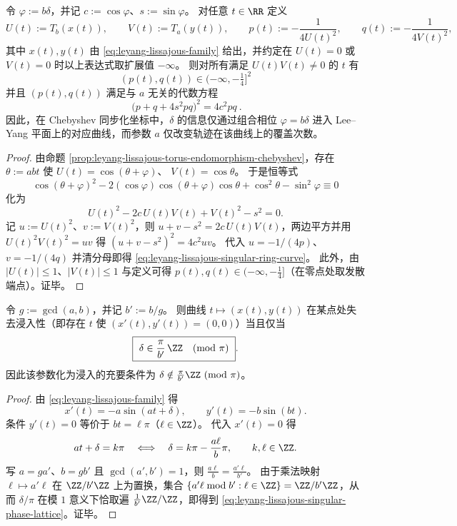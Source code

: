 \begin{theorem}\label{thm:leyang-lissajous-singular-ring-normal-form}
令 \(\varphi:=b\delta\)，并记 \(c:=\cos\varphi\)、\(s:=\sin\varphi\)。
对任意 \(t\in\RR\) 定义
\[
U(t):=T_b(x(t)),\qquad V(t):=T_a(y(t)),
\qquad
p(t):=-\frac{1}{4U(t)^2},\qquad q(t):=-\frac{1}{4V(t)^2},
\]
其中 \(x(t),y(t)\) 由 \eqref{eq:leyang-lissajous-family} 给出，并约定在 \(U(t)=0\) 或 \(V(t)=0\) 时以上表达式取扩展值 \(-\infty\)。
则对所有满足 \(U(t)V(t)\neq 0\) 的 \(t\) 有
\[
(p(t),q(t))\in(-\infty,-\tfrac14]^2
\]
并且 \((p(t),q(t))\) 满足与 \(a\) 无关的代数方程
\begin{equation}\label{eq:leyang-lissajous-singular-ring-curve}
\boxed{\ \bigl(p+q+4s^2pq\bigr)^2=4c^2pq\ }.
\end{equation}
因此，在 Chebyshev 同步化坐标中，\(\delta\) 的信息仅通过组合相位 \(\varphi=b\delta\) 进入 Lee--Yang 平面上的对应曲线，而参数 \(a\) 仅改变轨迹在该曲线上的覆盖次数。
\end{theorem}
\begin{proof}
由命题 \ref{prop:leyang-lissajous-torus-endomorphism-chebyshev}，存在 \(\theta:=abt\) 使
\(
U(t)=\cos(\theta+\varphi)
\)、
\(
V(t)=\cos\theta
\)。
于是恒等式
\[
\cos(\theta+\varphi)^2-2(\cos\varphi)\cos(\theta+\varphi)\cos\theta+\cos^2\theta-\sin^2\varphi\equiv 0
\]
化为
\[
U(t)^2-2c\,U(t)V(t)+V(t)^2-s^2=0.
\]
记 \(u:=U(t)^2\)、\(v:=V(t)^2\)，则
\(
u+v-s^2=2c\,U(t)V(t)
\)，两边平方并用 \(U(t)^2V(t)^2=uv\) 得
\(
(u+v-s^2)^2=4c^2uv
\)。
代入 \(u=-1/(4p)\)、\(v=-1/(4q)\) 并清分母即得 \eqref{eq:leyang-lissajous-singular-ring-curve}。
此外，由 \(|U(t)|\le 1\)、\(|V(t)|\le 1\) 与定义可得 \(p(t),q(t)\in(-\infty,-\tfrac14]\)（在零点处取发散端点）。证毕。
\end{proof}

\begin{theorem}[参数奇异点的判别与浸入条件]\label{thm:leyang-lissajous-immersion-criterion}
令 \(g:=\gcd(a,b)\)，并记 \(b':=b/g\)。
则曲线 \(t\mapsto (x(t),y(t))\) 在某点处失去浸入性（即存在 \(t\) 使 \((x'(t),y'(t))=(0,0)\)）当且仅当
\begin{equation}\label{eq:leyang-lissajous-singular-phase-lattice}
\boxed{\ \delta\in \frac{\pi}{b'}\,\ZZ\quad(\mathrm{mod}\ \pi)\ }.
\end{equation}
因此该参数化为浸入的充要条件为 \(\delta\notin \frac{\pi}{b'}\ZZ\ (\mathrm{mod}\ \pi)\)。
\end{theorem}
\begin{proof}
由 \eqref{eq:leyang-lissajous-family} 得
\[
x'(t)=-a\sin(at+\delta),\qquad y'(t)=-b\sin(bt).
\]
条件 \(y'(t)=0\) 等价于 \(bt=\ell\pi\)（\(\ell\in\ZZ\)）。
代入 \(x'(t)=0\) 得
\[
at+\delta=k\pi
\quad\Longleftrightarrow\quad
\delta=k\pi-\frac{a\ell}{b}\pi,
\qquad k,\ell\in\ZZ.
\]
写 \(a=ga'\)、\(b=gb'\) 且 \(\gcd(a',b')=1\)，则 \(\frac{a\ell}{b}=\frac{a'\ell}{b'}\)。
由于乘法映射 \(\ell\mapsto a'\ell\) 在 \(\ZZ/b'\ZZ\) 上为置换，集合 \(\{a'\ell\bmod b':\ell\in\ZZ\}=\ZZ/b'\ZZ\)，从而
\(
\delta/\pi
\)
在模 \(1\) 意义下恰取遍 \(\frac{1}{b'}\ZZ/\ZZ\)，即得到 \eqref{eq:leyang-lissajous-singular-phase-lattice}。证毕。
\end{proof}

